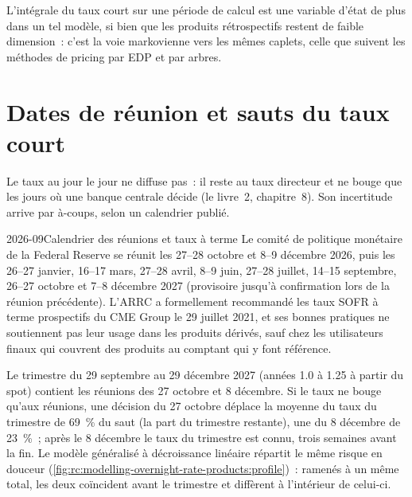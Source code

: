 L'intégrale du taux court sur une période de calcul est une variable d'état de plus
dans un tel modèle, si bien que les produits rétrospectifs restent de faible dimension~: c'est la
voie markovienne vers les mêmes caplets, celle que suivent les méthodes de pricing par EDP et par arbres.

\section{Dates de réunion et sauts du taux court}

Le taux au jour le jour ne diffuse pas~: il reste au taux directeur et ne bouge que les
jours où une banque centrale décide (le livre~2, chapitre~8). Son incertitude
arrive par à-coups, selon un calendrier publié.

\begin{dated}{2026-09}{Calendrier des réunions et taux à terme}\label{dat:rc:modelling-overnight-rate-products:term}
Le comité de politique monétaire de la Federal Reserve se réunit les 27--28 octobre et 8--9 décembre
2026, puis les 26--27 janvier, 16--17 mars, 27--28 avril, 8--9 juin, 27--28 juillet,
14--15 septembre, 26--27 octobre et 7--8 décembre 2027 (provisoire jusqu'à confirmation
lors de la réunion précédente). L'ARRC a formellement recommandé les taux SOFR à terme prospectifs du CME Group
le 29 juillet 2021, et ses bonnes pratiques ne soutiennent pas leur usage dans les produits
dérivés, sauf chez les utilisateurs finaux qui couvrent des produits au comptant qui y font référence.
\end{dated}

\label{lst:rc:modelling-overnight-rate-products:meetings}

\begin{example}\label{ex:rc:modelling-overnight-rate-products:meetings}
Le trimestre du 29 septembre au 29 décembre 2027 (années 1.0 à 1.25 à partir du spot)
contient les réunions des 27 octobre et 8 décembre. Si le taux ne bouge qu'aux
réunions, une décision du 27 octobre déplace la moyenne du taux du trimestre de 69~\% du
saut (la part du trimestre restante), une du 8 décembre de 23~\%~; après le 8 décembre le
taux du trimestre est connu, trois semaines avant la fin. Le modèle généralisé à
décroissance linéaire répartit le même risque en douceur
(\cref{fig:rc:modelling-overnight-rate-products:profile})~: ramenés à un même total, les deux
coïncident avant le trimestre et diffèrent à l'intérieur de celui-ci.
\end{example}

